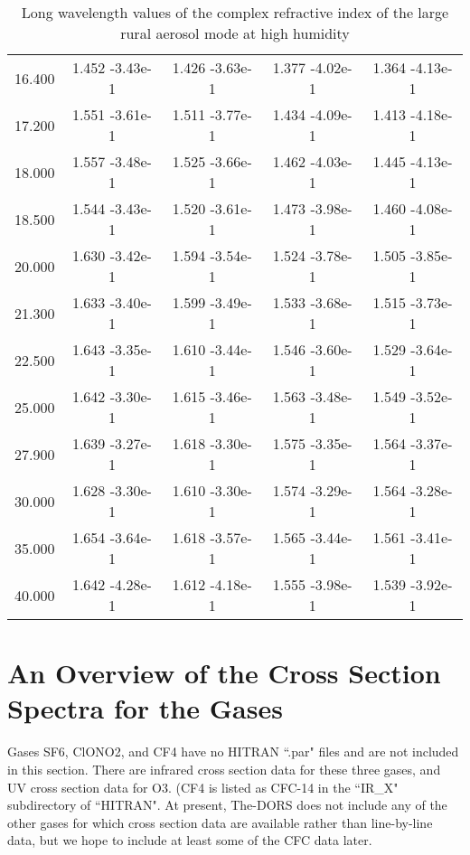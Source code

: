 \documentclass[12pt]{article}
\begin{document}
\begin{center}
\begin{table}
\begin{tabular}{| c | c | c | c | c |  }
16.400  &   1.452   -3.43e-1 &   1.426   -3.63e-1  &  1.377   -4.02e-1  &  1.364   -4.13e-1  \\
17.200  &   1.551   -3.61e-1  &  1.511   -3.77e-1 &   1.434   -4.09e-1 &   1.413   -4.18e-1  \\
18.000  &   1.557   -3.48e-1 &   1.525   -3.66e-1 &   1.462   -4.03e-1 &   1.445   -4.13e-1  \\
18.500  &   1.544   -3.43e-1 &   1.520   -3.61e-1 &   1.473   -3.98e-1 &   1.460   -4.08e-1  \\
20.000  &   1.630   -3.42e-1 &   1.594   -3.54e-1  &  1.524   -3.78e-1 &   1.505   -3.85e-1  \\
21.300  &   1.633   -3.40e-1  &  1.599   -3.49e-1 &   1.533   -3.68e-1 &   1.515   -3.73e-1  \\
22.500  &   1.643   -3.35e-1  &  1.610   -3.44e-1 &   1.546   -3.60e-1  &  1.529   -3.64e-1  \\
25.000  &   1.642   -3.30e-1  &  1.615   -3.46e-1 &   1.563   -3.48e-1  &  1.549   -3.52e-1  \\
27.900  &   1.639   -3.27e-1  &  1.618   -3.30e-1 &   1.575   -3.35e-1  &  1.564   -3.37e-1  \\
30.000  &   1.628   -3.30e-1 &   1.610   -3.30e-1 &   1.574   -3.29e-1  &  1.564   -3.28e-1  \\
35.000  &   1.654   -3.64e-1 &   1.618   -3.57e-1  &  1.565   -3.44e-1  &  1.561   -3.41e-1  \\
40.000  &   1.642   -4.28e-1 &   1.612   -4.18e-1  &  1.555   -3.98e-1  &  1.539   -3.92e-1 \\
\hline
\end{tabular}
\caption{Long wavelength values of the complex refractive index of the large rural aerosol mode at high humidity}
\end{table}
\end{center}

\section{An Overview of the Cross Section Spectra for the Gases}

Gases SF6, ClONO2, and CF4 have no HITRAN ``.par" files and are not included in this section.
There are infrared cross section data for these three gases, and UV cross section data for O3.
(CF4 is listed as CFC-14 in the ``IR_X" subdirectory of ``HITRAN".
At present, The-DORS does not include any of the other gases for which cross section data are available
rather than line-by-line data, but we hope to include at least some of the CFC data later.
\end{document}

